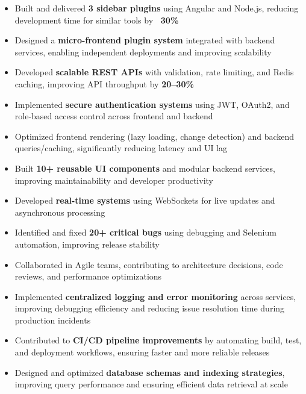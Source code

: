 \documentclass[10pt, letterpaper]{article}
\begin{document}
	\begin{itemize}
		\item Built and delivered \textbf{3 sidebar plugins} using Angular and Node.js,
			reducing development time for similar tools by \textbf{~30\%}

		\item Designed a \textbf{micro-frontend plugin system} integrated with
			backend services, enabling independent deployments and improving scalability

		\item Developed \textbf{scalable REST APIs} with validation, rate limiting,
			and Redis caching, improving API throughput by \textbf{20–30\%}

		\item Implemented \textbf{secure authentication systems} using JWT, OAuth2,
			and role-based access control across frontend and backend

		\item Optimized frontend rendering (lazy loading, change detection) and
			backend queries/caching, significantly reducing latency and UI lag

		\item Built \textbf{10+ reusable UI components} and modular backend services,
			improving maintainability and developer productivity

		\item Developed \textbf{real-time systems} using WebSockets for live updates
			and asynchronous processing

		\item Identified and fixed \textbf{20+ critical bugs} using debugging and
			Selenium automation, improving release stability

		\item Collaborated in Agile teams, contributing to architecture decisions, code
			reviews, and performance optimizations

		\item Implemented \textbf{centralized logging and error monitoring} across
			services, improving debugging efficiency and reducing issue resolution time
			during production incidents

		\item Contributed to \textbf{CI/CD pipeline improvements} by automating
			build, test, and deployment workflows, ensuring faster and more reliable releases

		\item Designed and optimized \textbf{database schemas and indexing
			strategies}, improving query performance and ensuring efficient data retrieval
			at scale
	\end{itemize}
\end{document}
